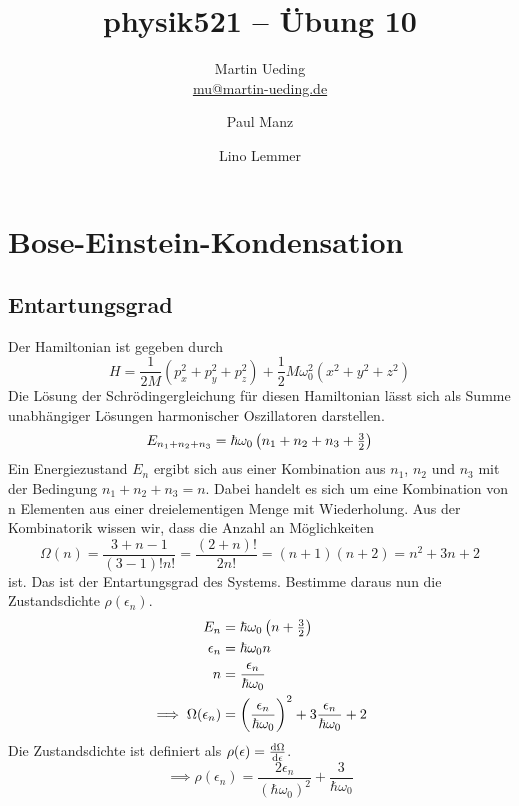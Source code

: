 

\title{physik521 – Übung 10}
\author{
	Martin Ueding \\ \small{\href{mailto:mu@martin-ueding.de}{mu@martin-ueding.de}}
        \and Paul Manz
        \and Lino Lemmer
}

\pagestyle{plain}



\maketitle


\IfFileExists{\bibliographyfile}{
    \printbibliography
}{}


\section{Bose-Einstein-Kondensation}
\subsection{Entartungsgrad}
Der Hamiltonian ist gegeben durch
\[H = \frac{1}{2M}(p^2_x+p^2_y+p^2_z)+\frac{1}{2}M \omega^2_0(x^2+y^2+z^2) \]
Die Lösung der Schrödingergleichung für diesen Hamiltonian lässt sich als Summe unabhängiger Lösungen harmonischer Oszillatoren darstellen.
\[E_{n_1+n_2+n_3} = \hbar \omega_0 \del{n_1+n_2+n_3+\tfrac{3}{2}} \]
Ein Energiezustand $E_n$ ergibt sich aus einer Kombination aus $n_1$, $n_2$ und $n_3$ mit der Bedingung $n_1+n_2+n_3=n$. Dabei handelt es sich um eine Kombination von n Elementen aus einer dreielementigen Menge mit Wiederholung. Aus der Kombinatorik wissen wir, dass die Anzahl an Möglichkeiten
\[\Omega(n)=\frac{3+n-1}{(3-1)!n!}=\frac{(2+n)!}{2n!}=(n+1)(n+2)=n^2+3n+2 \]
ist. Das ist der Entartungsgrad des Systems. Bestimme daraus nun die Zustandsdichte $\rho(\epsilon_n)$.
\begin{align*}
E_n &= \hbar \omega_0 \del{n+ \tfrac{3}{2}} \\
\epsilon_n &= \hbar \omega_0 n \\
n &= \frac{\epsilon_n}{\hbar \omega_0} \\
\implies \Omega(\epsilon_n) &= \del{\frac{\epsilon_n}{\hbar \omega_0}}^2 +3\frac{\epsilon_n}{\hbar \omega_0}+2
\end{align*}
Die Zustandsdichte ist definiert als $\rho(\epsilon)=\frac{\dif \Omega}{\dif \epsilon}$.
\[ \implies \rho(\epsilon_n) = \frac{2\epsilon_n}{(\hbar \omega_0)^2} +\frac{3}{\hbar \omega_0} \]

